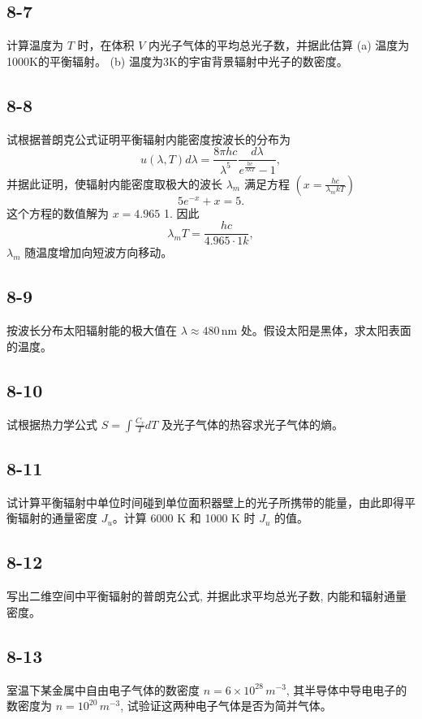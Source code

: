 \newpage
\subsection{8-7}
计算温度为 $T$ 时，在体积 $V$ 内光子气体的平均总光子数，并据此估算
(a) 温度为1000K的平衡辐射。
(b) 温度为3K的宇宙背景辐射中光子的数密度。

\newpage
\subsection{8-8}
试根据普朗克公式证明平衡辐射内能密度按波长的分布为
$$ u(\lambda, T) d\lambda = \frac{8 \pi hc}{\lambda^5} \frac{d\lambda}{e^{\frac{hc}{\lambda kT}} - 1}, $$
并据此证明，使辐射内能密度取极大的波长 $\lambda_m$ 满足方程 $\left( x = \frac{hc}{\lambda_m kT} \right)$
$$ 5 e^{-x} + x = 5. $$
这个方程的数值解为 $ x = 4.965 $ 1. 因此
$$ \lambda_m T = \frac{hc}{4.965 \cdot 1 k}, $$
$\lambda_m$ 随温度增加向短波方向移动。

\newpage
\subsection{8-9}
按波长分布太阳辐射能的极大值在 $\lambda \approx 480 \, \text{nm}$ 处。假设太阳是黑体，求太阳表面的温度。

\newpage
\subsection{8-10}
试根据热力学公式 $ S = \int \frac{C_v}{T} dT $ 及光子气体的热容求光子气体的熵。

\newpage
\subsection{8-11}
试计算平衡辐射中单位时间碰到单位面积器壁上的光子所携带的能量，由此即得平衡辐射的通量密度 $ J_u $。计算 6000 K 和 1000 K 时 $ J_u $ 的值。

\newpage
\subsection{8-12}
写出二维空间中平衡辐射的普朗克公式, 并据此求平均总光子数, 内能和辐射通量密度。

\newpage
\subsection{8-13}
室温下某金属中自由电子气体的数密度 $ n = 6 \times 10^{28} \, m^{-3} $, 其半导体中导电电子的数密度为 $ n = 10^{20} \, m^{-3} $, 试验证这两种电子气体是否为简并气体。

